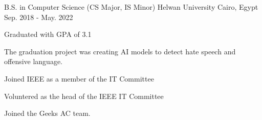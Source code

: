 

\begin{cventries}

  \cventry
    {B.S. in Computer Science (CS Major, IS Minor)} %
    {Helwan University} %
    {Cairo, Egypt} %
    {Sep. 2018 - May. 2022} %
    {
      \begin{cvitems} %
        \item {Graduated with GPA of 3.1}
        \item {The graduation project was creating AI models to detect hate speech and offensive language.}
        \item {Joined IEEE as a member of the IT Committee}
        \item {Voluntered as the head of the IEEE IT Committee}
        \item {Joined the Geeks AC team.}
      \end{cvitems}
    }


\end{cventries}
